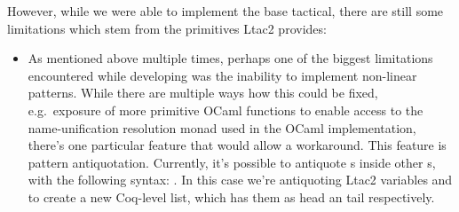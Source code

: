 However, while we were able to implement the base tactical, there are still some limitations which stem from the primitives Ltac2 provides:
\begin{itemize}
\item
  As mentioned above multiple times, perhaps one of the biggest limitations encountered while developing  was the inability to implement non-linear patterns.
While there are multiple ways how this could be fixed, e.g.\ exposure of more primitive
OCaml functions to enable access to the name-unification resolution monad used in the OCaml implementation, there's one particular feature that would allow a workaround.
  This feature is pattern antiquotation.
  Currently, it's possible to antiquote s inside other s, with the following syntax: .
    In this case we're antiquoting Ltac2 variables  and  to create a new Coq-level list, which has them as head an tail respectively.


\end{itemize}
